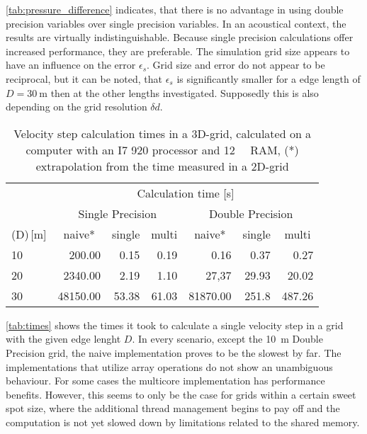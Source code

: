 \autoref{tab:pressure_difference} indicates, that there is no advantage in using double precision variables over single precision variables. In an acoustical context, the results are virtually indistinguishable. Because single precision calculations offer increased performance, they are preferable. The simulation grid size appears to have an influence on the error $\epsilon_s$. Grid size and error do not appear to be reciprocal, but it can be noted, that $\epsilon_s$ is significantly smaller for a edge length of $D=\SI{30}{\meter}$ then at the other lengths investigated. Supposedly this is also depending on the grid resolution $\delta d$.

\begin{table}[h]
\centering
\caption{Velocity step calculation times in a 3D-grid, calculated on a computer with an I7 920 processor and \SI{12}{\giga\byte} RAM, (*) extrapolation from the time measured in a 2D-grid}
\label{tab:times}
\begin{tabular}{l|c|r|r|r|r|r}
                                         & \multicolumn{6}{c}{Calculation time [\si{\second}]}                                                                                                                             \\ \cline{2-7} 
                                         & \multicolumn{3}{c|}{Single Precision}                                                    & \multicolumn{3}{c}{Double Precision}                                                 \\ \hline
\multicolumn{1}{l|}{(D)\,[\si{\meter}]} & naive*                        & \multicolumn{1}{c|}{single} & \multicolumn{1}{c|}{multi} & \multicolumn{1}{c|}{naive*} & \multicolumn{1}{c|}{single} & \multicolumn{1}{c}{multi} \\ \hline
10                                       & \multicolumn{1}{r|}{200.00}   & 0.15                        & 0.19                       & 0.16                        & 0.37                        & 0.27                      \\
20                                       & \multicolumn{1}{r|}{2340.00}  & 2.19                        & 1.10                       & 27,37                       & 29.93                       & 20.02                     \\
30                                       & \multicolumn{1}{r|}{48150.00} & 53.38                       & 61.03                      & 81870.00                            & 251.8                            & 487.26                         
\end{tabular}
\end{table}

\autoref{tab:times} shows the times it took to calculate a single velocity step in a grid with the given edge lenght \(D\). In every scenario, except the \SI{10}{\meter} Double Precision grid, the naive implementation proves to be the slowest by far. The implementations that utilize array operations do not show an unambiguous behaviour. For some cases the multicore implementation has performance benefits. However, this seems to only be the case for grids within a certain sweet spot size, where the additional thread management begins to pay off and the computation is not yet slowed down by limitations related to the shared memory.